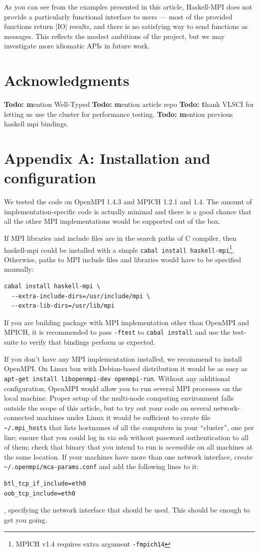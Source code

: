 \documentclass{tmr}
\newcommand{\Todo}[1]{{\textbf{Todo: #1}}}
\begin{document}
As you can see from the examples presented in this article, Haskell-MPI
does not provide a particularly functional interface to users --- most of the provided functions return
|IO| results, and there is no satisfying way to send functions as messages. This reflects the
modest ambitions of the project, but we may investigate more idiomatic APIs in future work.

\section{Acknowledgments}

\Todo mention Well-Typed
\Todo mention article repo
\Todo thank VLSCI for letting us use the cluster for performance testing.
\Todo mention previous haskell mpi bindings.

\section{Appendix A: Installation and configuration}
\label{appendix-A}
We tested the code on OpenMPI 1.4.3 and MPICH 1.2.1 and 1.4. The amount of
implementation-specific code is actually minimal and there is a good
chance that all the other MPI implementations would be supported out
of the box.

If MPI libraries and include files are in the search paths of C
compiler, then haskell-mpi could be installed with a simple 
\verb|cabal install haskell-mpi|\footnote{MPICH v1.4 requires extra argument \verb|-fmpich14|}. Otherwise, paths to MPI include
files and libraries would have to be specified manually:
\begin{Verbatim}
cabal install haskell-mpi \
  --extra-include-dirs=/usr/include/mpi \
  --extra-lib-dirs=/usr/lib/mpi
\end{Verbatim}

If you are building package with MPI implementation other than
OpenMPI and MPICH, it is recommended to pass \verb|-ftest| to
\verb|cabal install| and use the test-suite to verify that bindings
perform as expected.

If you don't have any MPI implementation installed, we recommend to
install OpenMPI. On Linux box with Debian-based distribution it would
be as easy as \verb|apt-get install libopenmpi-dev openmpi-run|.
Without any additional configuration, OpenMPI would allow you to run
several MPI processes on the local machine. Proper setup of the
multi-node computing environment falls outside the scope of this
article, but to try out your code on several network-connected
machines under Linux it would be sufficient to create file \verb|~/.mpi_hosts|
that lists hostnames of all the computers in your ``cluster'', one per
line; ensure that you could log in via ssh without password
authentication to all of them; check that binary that you intend to
run is accessible on all machines at the same location. If your
machines have more than one network interface, create
\verb|~/.openmpi/mca-params.conf| and add the following lines to it:
\begin{Verbatim}
btl_tcp_if_include=eth0
oob_tcp_include=eth0
\end{Verbatim}
, specifying the network interface that should be used. This should be enough to get you going.


\end{document}
